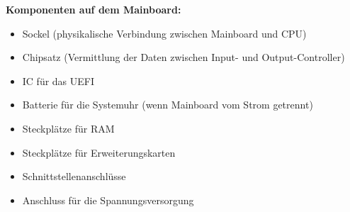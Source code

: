 \documentclass[asp1.tex]{subfiles}
\begin{document}
\textbf{Komponenten auf dem Mainboard:}
\begin{itemize}
    \item Sockel (physikalische Verbindung zwischen Mainboard und CPU)
    \item Chipsatz (Vermittlung der Daten zwischen Input- und Output-Controller)
    \item IC für das UEFI
    \item Batterie für die Systemuhr (wenn Mainboard vom Strom getrennt)
    \item Steckplätze für RAM
    \item Steckplätze für Erweiterungskarten
    \item Schnittstellenanschlüsse
    \item Anschluss für die Spannungsversorgung
\end{itemize}
\end{document}
